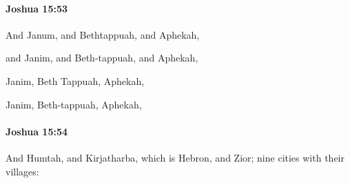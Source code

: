 		\paragraph{Joshua 15:53} %
			\label{JOSHUA-15-53}

			And Janum, and Bethtappuah, and Aphekah,

			\begin{versebox}
					\item[BHS] 
					\item[ASV] and Janim, and Beth-tappuah, and Aphekah,
					\item[NIV] Janim, Beth Tappuah, Aphekah,
					\item[NRSV] Janim, Beth-tappuah, Aphekah,
			\end{versebox}

		\paragraph{Joshua 15:54} %
			\label{JOSHUA-15-54}

			And Humtah, and Kirjatharba, which is Hebron, and Zior; nine cities with their villages:

